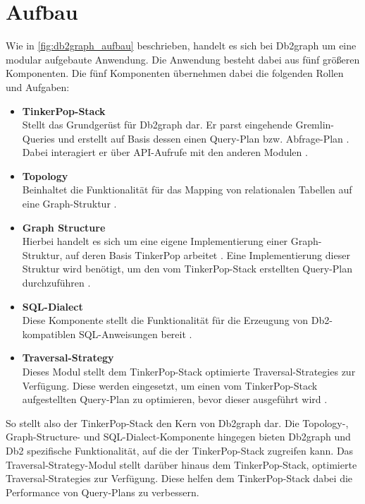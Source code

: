 \section{Aufbau}
Wie in \autoref{fig:db2graph_aufbau} beschrieben, handelt es sich bei Db2graph um eine modular aufgebaute Anwendung. Die Anwendung besteht dabei aus fünf größeren Komponenten. Die fünf Komponenten übernehmen dabei die folgenden Rollen und Aufgaben: 

\begin{itemize}
    \item \textbf{TinkerPop-Stack}\\Stellt das Grundgerüst für Db2graph dar. Er parst eingehende Gremlin-Queries und erstellt auf Basis dessen einen Query-Plan bzw. Abfrage-Plan \cite{vldb_tian}. Dabei interagiert er über API-Aufrufe mit den anderen Modulen \cite{vldb_tian}.
    \item \textbf{Topology}\\Beinhaltet die Funktionalität für das Mapping von relationalen Tabellen auf eine Graph-Struktur \cite{vldb_tian, sigmod_tian}.
    \item \textbf{Graph Structure}\\Hierbei handelt es sich um eine eigene Implementierung einer Graph-Struktur, auf deren Basis TinkerPop arbeitet \cite{vldb_tian}. Eine Implementierung dieser Struktur wird benötigt, um den vom TinkerPop-Stack erstellten Query-Plan durchzuführen \cite{sigmod_tian}. 
    \item \textbf{SQL-Dialect}\\Diese Komponente stellt die Funktionalität für die Erzeugung von Db2-kompatiblen SQL-Anweisungen bereit \cite{sigmod_tian}.
    \item \textbf{Traversal-Strategy}\\Dieses Modul stellt dem TinkerPop-Stack optimierte Traversal-Strategies zur Verfügung. Diese werden eingesetzt, um einen vom TinkerPop-Stack aufgestellten Query-Plan zu optimieren, bevor dieser ausgeführt wird \cite{sigmod_tian}.  
\end{itemize}

So stellt also der TinkerPop-Stack den Kern von Db2graph dar. Die Topology-, Graph-Structure- und SQL-Dialect-Komponente hingegen bieten Db2graph und Db2 spezifische Funktionalität, auf die der TinkerPop-Stack zugreifen kann. Das Traversal-Strategy-Modul stellt darüber hinaus dem TinkerPop-Stack, optimierte Traversal-Strategies zur Verfügung. Diese helfen dem TinkerPop-Stack dabei die Performance von Query-Plans zu verbessern.  

